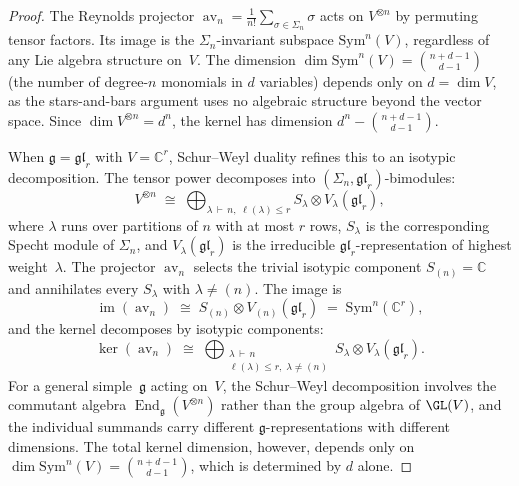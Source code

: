 \documentclass[11pt,reqno]{amsart}
\theoremstyle{definition}
\theoremstyle{remark}
\newcommand{\Sym}{\mathrm{Sym}}
\DeclareMathOperator{\End}{End}
\DeclareMathOperator{\av}{av}
\newcommand{\fg}{\mathfrak{g}}
\newcommand{\CC}{\mathbb{C}}
\numberwithin{equation}{section}
\begin{document}
\begin{proof}
The Reynolds projector
$\av_n = \frac{1}{n!}\sum_{\sigma \in \Sigma_n} \sigma$
acts on $V^{\otimes n}$ by permuting tensor factors.
Its image is the $\Sigma_n$-invariant subspace
$\Sym^n(V)$, regardless of any Lie algebra structure
on~$V$. The dimension
$\dim\Sym^n(V) = \binom{n+d-1}{d-1}$ (the number of
degree-$n$ monomials in $d$ variables) depends only on
$d = \dim V$, as the stars-and-bars argument uses no
algebraic structure beyond the vector space.
Since $\dim V^{\otimes n} = d^n$, the kernel has dimension
$d^n - \binom{n+d-1}{d-1}$.

When $\fg = \mathfrak{gl}_r$ with $V = \CC^r$,
Schur--Weyl duality refines this to an isotypic
decomposition. The tensor power decomposes into
$(\Sigma_n, \mathfrak{gl}_r)$-bimodules:
\begin{equation}\label{eq:schur-weyl-decomp}
  V^{\otimes n}
  \;\cong\;
  \bigoplus_{\lambda \,\vdash\, n,\;
    \ell(\lambda) \leq r}
  S_\lambda \otimes V_\lambda(\mathfrak{gl}_r),
\end{equation}
where $\lambda$ runs over partitions of $n$ with at most
$r$ rows, $S_\lambda$ is the corresponding Specht module
of $\Sigma_n$, and $V_\lambda(\mathfrak{gl}_r)$ is the
irreducible $\mathfrak{gl}_r$-representation of highest
weight~$\lambda$.
The projector $\av_n$ selects the trivial isotypic
component $S_{(n)} = \CC$ and annihilates every
$S_\lambda$ with $\lambda \neq (n)$. The image is
\[
  \operatorname{im}(\av_n)
  \;\cong\;
  S_{(n)} \otimes V_{(n)}(\mathfrak{gl}_r)
  \;=\;
  \Sym^n(\CC^r),
\]
and the kernel decomposes by isotypic components:
\[
  \ker(\av_n)
  \;\cong\;
  \bigoplus_{\substack{\lambda \,\vdash\, n \\
    \ell(\lambda) \leq r,\;
    \lambda \neq (n)}}
  S_\lambda \otimes V_\lambda(\mathfrak{gl}_r).
\]
For a general simple~$\fg$ acting on~$V$, the Schur--Weyl
decomposition involves the commutant algebra
$\End_\fg(V^{\otimes n})$ rather than the group algebra of
$\GL(V)$, and the individual summands carry different
$\fg$-representations with different dimensions.
The total kernel dimension, however, depends only on
$\dim\Sym^n(V) = \binom{n+d-1}{d-1}$, which is
determined by $d$ alone.
\end{proof}
\end{document}
